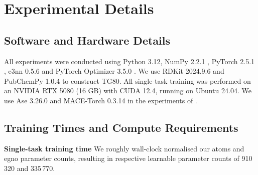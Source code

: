 
\section{Experimental Details}
\label{sect:details}

\subsection{Software and Hardware Details}
All experiments were conducted using Python 3.12, NumPy 2.2.1 \cite{harris_array_2020}, PyTorch 2.5.1 \cite{paszke_pytorch_2019}, e3nn 0.5.6 \cite{geiger_e3nn_2022} and PyTorch Optimizer 3.5.0 \cite{kim_pytorch_optimizer_2021}. We use RDKit 2024.9.6 \cite{greg_landrum_rdkitrdkit_2025} and PubChemPy 1.0.4 to construct TG80. All single-task training was performed on an NVIDIA RTX 5080 (16 GB) with CUDA 12.4, running on Ubuntu 24.04. {We use Ase 3.26.0 \cite{larsen_atomic_2017} and MACE-Torch 0.3.14 \cite{kovacs_mace-off_2025} in the experiments of .}

\subsection{Training Times and Compute Requirements}
\label{sec:model_compute_time}
\textbf{Single-task training time} We roughly wall-clock normalised our \gls{atoms} and \gls{egno} parameter counts, resulting in respective learnable parameter counts of 910\,320 and 335\,770.

